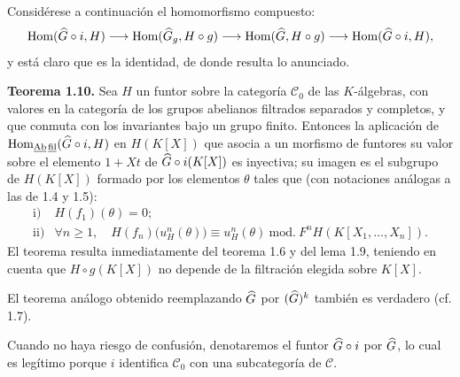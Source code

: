 Considérese a continuación el homomorfismo compuesto:
\[
  \operatorname{Hom}(\widehat G\circ i,H)\longrightarrow
  \operatorname{Hom}(\widehat G_g,H\circ g)\longrightarrow
  \operatorname{Hom}(\widehat G,H\circ g)\longrightarrow
  \operatorname{Hom}(\widehat G\circ i,H),
\]
y está claro que es la identidad, de donde resulta lo anunciado.

\textbf{Teorema 1.10.} Sea \(H\) un funtor sobre la categoría \(\mathcal C_0\) de las \(K\)-álgebras, con valores en la categoría de los grupos abelianos filtrados separados y completos, y que conmuta con los invariantes bajo un grupo finito. Entonces la aplicación de \(\operatorname{Hom}_{\underline{\mathrm{Ab}}\,\underline{\mathrm{fil}}}(\widehat G\circ i,H)\) en \(H(K[X])\) que asocia a un morfismo de funtores su valor sobre el elemento \(1+Xt\) de \(\widehat G\circ i(K[X])\) es inyectiva; su imagen es el subgrupo de \(H(K[X])\) formado por los elementos \(\theta\) tales que (con notaciones análogas a las de 1.4 y 1.5):
\[
\begin{array}{ll}
\text{i)}& H(f_1)(\theta)=0;\\[0.3em]
\text{ii)}& \forall n\geq1,\quad
H(f_n)\bigl(u_H^n(\theta)\bigr)\equiv u_H^n(\theta)
\ \mathrm{mod.}\ F^nH(K[X_1,\ldots,X_n]).
\end{array}
\]
El teorema resulta inmediatamente del teorema 1.6 y del lema 1.9, teniendo en cuenta que \(H\circ g(K[X])\) no depende de la filtración elegida sobre \(K[X]\).

El teorema análogo obtenido reemplazando \(\widehat G\) por \((\widehat G)^k\) también es verdadero (cf. 1.7).

Cuando no haya riesgo de confusión, denotaremos el funtor \(\widehat G\circ i\) por \(\widehat G\), lo cual es legítimo porque \(i\) identifica \(\mathcal C_0\) con una subcategoría de \(\mathcal C\).
